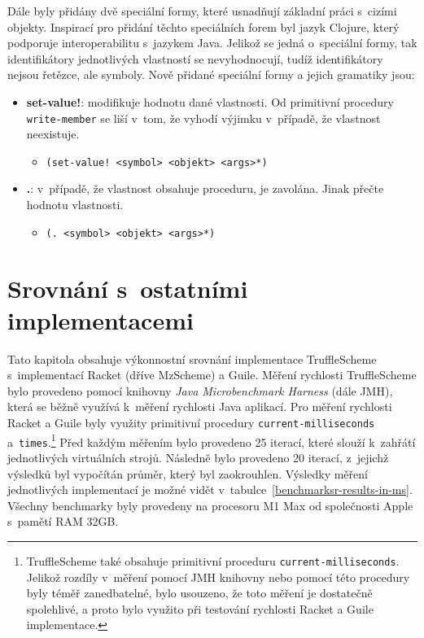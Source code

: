 \documentclass[
  master,
  biblatex,
  figures=true,
  theorems,
  sourcecodes,
  glossaries,
  index
]{kidiplom}
\begin{document}
Dále byly přidány dvě speciální formy, které usnadňují základní práci s~cizími objekty. Inspirací pro přidání těchto speciálních forem byl jazyk Clojure, který podporuje interoperabilitu s~jazykem Java. Jelikož se jedná o~speciální formy, tak identifikátory jednotlivých vlastností se nevyhodnocují, tudíž identifikátory nejsou řetězce, ale symboly. Nově přidané speciální formy a jejich gramatiky jsou: 

\begin{itemize}
    \item \textbf{set-value!}: modifikuje hodnotu dané vlastnosti. Od primitivní procedury \texttt{write-member} se liší v~tom, že vyhodí výjimku v~případě, že vlastnost neexistuje.  
    \begin{itemize}
        \item \texttt{(set-value! <symbol> <objekt> <args>*)} 
    \end{itemize}

    \item \textbf{.}: v~případě, že vlastnost obsahuje proceduru, je zavolána. Jinak přečte hodnotu vlastnosti. 
    \begin{itemize}
        \item \texttt{(. <symbol> <objekt> <args>*)} 
    \end{itemize}
\end{itemize}


\newpage

\section{Srovnání s~ostatními implementacemi}
\label{benchmark-chapter}
Tato kapitola obsahuje výkonnostní srovnání implementace TruffleScheme s~implementací Racket (dříve MzScheme) a Guile. Měření rychlosti TruffleScheme bylo provedeno pomocí knihovny \textit{Java Microbenchmark Harness} (dále JMH), která se běžně využívá k~měření rychlosti Java aplikací. Pro měření rychlosti Racket a Guile byly využity primitivní procedury \texttt{current-milliseconds} a~\texttt{times}.\footnote{TruffleScheme také obsahuje primitivní proceduru \texttt{current-milliseconds}. Jelikož rozdíly v~měření pomocí JMH knihovny nebo pomocí této procedury byly téměř zanedbatelné, bylo usouzeno, že toto měření je dostatečně spolehlivé, a proto bylo využito při testování rychlosti Racket a Guile implementace.} Před každým měřením bylo provedeno 25 iterací, které slouží k~zahřátí jednotlivých virtuálních strojů. Následně bylo provedeno 20 iterací, z~jejichž výsledků byl vypočítán průměr, který byl zaokrouhlen. Výsledky měření jednotlivých implementací je možné vidět v~tabulce~\ref{benchmarksr-results-in-ms}. Všechny benchmarky byly provedeny na procesoru M1 Max od společnosti Apple s~pamětí RAM 32GB. 
\end{document}
